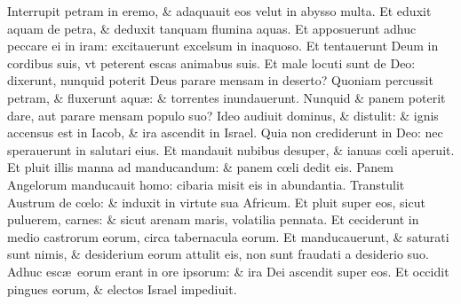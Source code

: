\documentclass[a5paper,10pt]{book}
\def\ae{æ}
\def\oe{œ}
\begin{document}
\begin{multicols*}{2}
\newline \color{red} I\color{black}nterrupit petram in eremo, \& adaquauit eos velut in abysso multa.
\newline \color{red} E\color{black}t eduxit aquam de petra, \& deduxit tanquam flumina aquas.
\newline \color{red} E\color{black}t apposuerunt adhuc peccare ei in iram: excitauerunt excelsum in inaquoso.
\newline \color{red} E\color{black}t tentauerunt Deum in cordibus suis, vt peterent escas animabus suis.
\newline \color{red} E\color{black}t male locuti sunt de Deo: dixerunt, nunquid poterit Deus parare mensam in deserto?
\newline \color{red} Q\color{black}uoniam percussit petram, \& fluxerunt aqu\ae : \& torrentes inundauerunt.
\newline \color{red} N\color{black}unquid \& panem poterit dare, aut parare mensam populo suo?
\newline \color{red} I\color{black}deo audiuit dominus, \& distulit: \& ignis accensus est in Iacob, \& ira ascendit in Israel.
\newline \color{red} Q\color{black}uia non crediderunt in Deo: nec sperauerunt in salutari eius.
\newline \color{red} E\color{black}t mandauit nubibus desuper, \& ianuas c\oe li aperuit.
\newline \color{red} E\color{black}t pluit illis manna ad manducandum: \& panem c\oe li dedit eis.
\newline \color{red} P\color{black}anem Angelorum manducauit homo: cibaria misit eis in abundantia.
\newline \color{red} T\color{black}ranstulit Austrum de c\oe lo: \& induxit in virtute sua Africum.
\newline \color{red} E\color{black}t pluit super eos, sicut puluerem, carnes: \& sicut arenam maris, volatilia pennata.
\newline \color{red} E\color{black}t ceciderunt in medio castrorum eorum, circa tabernacula eorum.
\newline \color{red} E\color{black}t manducauerunt, \& saturati sunt nimis, \& desiderium eorum attulit eis, non sunt fraudati a desiderio suo.
\newline \color{red} A\color{black}dhuc esc\ae \ eorum erant in ore ipsorum: \& ira Dei ascendit super eos.
\newline \color{red} E\color{black}t occidit pingues eorum, \& electos Israel impediuit.

\end{multicols*}
\end{document}
